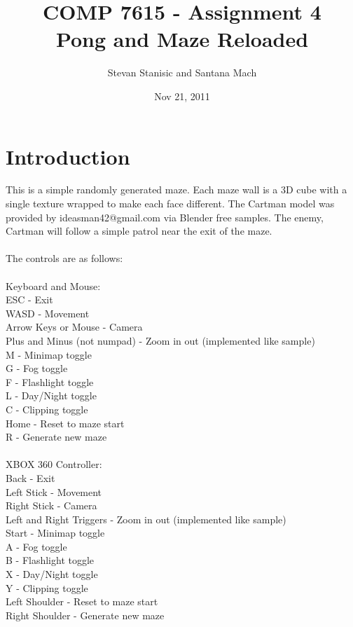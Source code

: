 \documentclass[titlepage]{article}
\begin{document}
\author{Stevan Stanisic and Santana Mach}
\title{COMP 7615 - Assignment 4 \\ Pong and Maze Reloaded}
\date{Nov 21, 2011}
\maketitle{}

\pagebreak

\section{Introduction}

This is a simple randomly generated maze. Each maze wall is a 3D cube with a single texture wrapped to make each face different.
The Cartman model was provided by ideasman42@gmail.com via Blender free samples.  The enemy, Cartman will follow a simple patrol near the exit of the maze.
\\
\\
The controls are as follows: \\
\\
Keyboard and Mouse: \\
ESC - Exit \\
WASD - Movement \\
Arrow Keys or Mouse - Camera \\
Plus and Minus (not numpad) - Zoom in out (implemented like sample) \\
M - Minimap toggle \\
G - Fog toggle \\
F - Flashlight toggle \\
L - Day/Night toggle \\
C - Clipping toggle \\
Home - Reset to maze start \\
R - Generate new maze \\
\\
XBOX 360 Controller: \\
Back - Exit \\
Left Stick - Movement \\
Right Stick - Camera \\
Left and Right Triggers - Zoom in out (implemented like sample) \\
Start - Minimap toggle \\
A - Fog toggle \\
B - Flashlight toggle \\
X - Day/Night toggle \\
Y - Clipping toggle \\
Left Shoulder - Reset to maze start \\
Right Shoulder - Generate new maze \\
\end{document}
